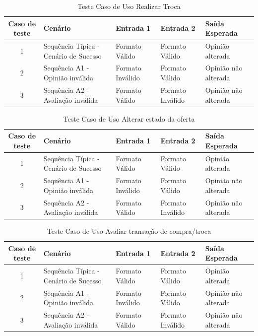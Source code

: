 \documentclass[a4paper,11pt]{article}
\begin{document}
	\begin{center}
	\begin{table}[H]
		\begin{tabularx}{\textwidth}{c|X|X|X|X}
			\textbf{Caso de teste} & \textbf{Cenário} & \textbf{Entrada 1} & \textbf{Entrada 2} & \textbf{Saída Esperada} \\
			\hline
			1 & Sequência Típica - Cenário de Sucesso & Formato Válido & Formato Válido & Opinião alterada\\ \hline
			2 & Sequência A1 - Opinião inválida & Formato Inválido & Formato Válido & Opinião não alterada\\ \hline
			3 & Sequência A2 - Avaliação inválida & Formato Válido & Formato Inválido & Opinião não alterada\\ \hline
			
		\end{tabularx}
		\caption{Teste Caso de Uso Realizar Troca}
	\end{table}
	\end{center}
	
	\begin{center}
	\begin{table}[H]
		\begin{tabularx}{\textwidth}{c|X|X|X|X}
			\textbf{Caso de teste} & \textbf{Cenário} & \textbf{Entrada 1} & \textbf{Entrada 2} & \textbf{Saída Esperada} \\
			\hline
			1 & Sequência Típica - Cenário de Sucesso & Formato Válido & Formato Válido & Opinião alterada\\ \hline
			2 & Sequência A1 - Opinião inválida & Formato Inválido & Formato Válido & Opinião não alterada\\ \hline
			3 & Sequência A2 - Avaliação inválida & Formato Válido & Formato Inválido & Opinião não alterada\\ \hline
			
		\end{tabularx}
		\caption{Teste Caso de Uso Alterar estado da oferta}
	\end{table}
	\end{center}
	
	\begin{center}
	\begin{table}[H]
		\begin{tabularx}{\textwidth}{c|X|X|X|X}
			\textbf{Caso de teste} & \textbf{Cenário} & \textbf{Entrada 1} & \textbf{Entrada 2} & \textbf{Saída Esperada} \\
			\hline
			1 & Sequência Típica - Cenário de Sucesso & Formato Válido & Formato Válido & Opinião alterada\\ \hline
			2 & Sequência A1 - Opinião inválida & Formato Inválido & Formato Válido & Opinião não alterada\\ \hline
			3 & Sequência A2 - Avaliação inválida & Formato Válido & Formato Inválido & Opinião não alterada\\ \hline
			
		\end{tabularx}
		\caption{Teste Caso de Uso Avaliar transação de compra/troca}
	\end{table}
	\end{center}
	
\end{document}
